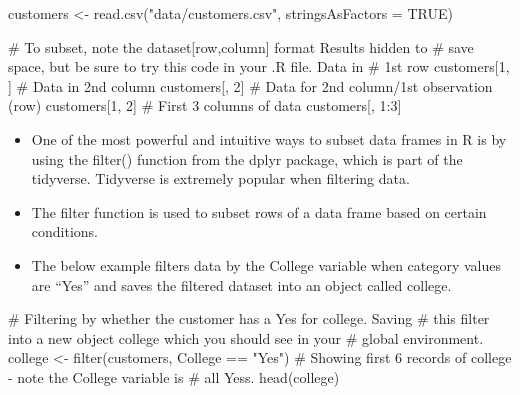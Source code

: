 \documentclass[
  letterpaper,
  DIV=11,
  numbers=noendperiod]{scrreprt}
\newenvironment{Shaded}{\begin{snugshade}}{\end{snugshade}}
\newcommand{\AttributeTok}[1]{\textcolor[rgb]{0.40,0.45,0.13}{#1}}
\newcommand{\CommentTok}[1]{\textcolor[rgb]{0.37,0.37,0.37}{#1}}
\newcommand{\ConstantTok}[1]{\textcolor[rgb]{0.56,0.35,0.01}{#1}}
\newcommand{\DecValTok}[1]{\textcolor[rgb]{0.68,0.00,0.00}{#1}}
\newcommand{\FunctionTok}[1]{\textcolor[rgb]{0.28,0.35,0.67}{#1}}
\newcommand{\NormalTok}[1]{\textcolor[rgb]{0.00,0.23,0.31}{#1}}
\newcommand{\OtherTok}[1]{\textcolor[rgb]{0.00,0.23,0.31}{#1}}
\newcommand{\SpecialCharTok}[1]{\textcolor[rgb]{0.37,0.37,0.37}{#1}}
\newcommand{\StringTok}[1]{\textcolor[rgb]{0.13,0.47,0.30}{#1}}
\providecommand{\tightlist}{%
  \setlength{\itemsep}{0pt}\setlength{\parskip}{0pt}}\usepackage{longtable,booktabs,array}
\begin{document}
\begin{Shaded}
\begin{Highlighting}[]
\NormalTok{customers }\OtherTok{\textless{}{-}} \FunctionTok{read.csv}\NormalTok{(}\StringTok{"data/customers.csv"}\NormalTok{, }\AttributeTok{stringsAsFactors =} \ConstantTok{TRUE}\NormalTok{)}

\CommentTok{\# To subset, note the dataset[row,column] format Results hidden to}
\CommentTok{\# save space, but be sure to try this code in your .R file.  Data in}
\CommentTok{\# 1st row}
\NormalTok{customers[}\DecValTok{1}\NormalTok{, ]}
\CommentTok{\# Data in 2nd column}
\NormalTok{customers[, }\DecValTok{2}\NormalTok{]}
\CommentTok{\# Data for 2nd column/1st observation (row)}
\NormalTok{customers[}\DecValTok{1}\NormalTok{, }\DecValTok{2}\NormalTok{]}
\CommentTok{\# First 3 columns of data}
\NormalTok{customers[, }\DecValTok{1}\SpecialCharTok{:}\DecValTok{3}\NormalTok{]}
\end{Highlighting}
\end{Shaded}

\begin{itemize}
\tightlist
\item
  One of the most powerful and intuitive ways to subset data frames in R
  is by using the filter() function from the dplyr package, which is
  part of the tidyverse. Tidyverse is extremely popular when filtering
  data.
\item
  The filter function is used to subset rows of a data frame based on
  certain conditions.
\item
  The below example filters data by the College variable when category
  values are ``Yes'' and saves the filtered dataset into an object
  called college.
\end{itemize}

\begin{Shaded}
\begin{Highlighting}[]
\CommentTok{\# Filtering by whether the customer has a \textquotesingle{}Yes\textquotesingle{} for college.  Saving}
\CommentTok{\# this filter into a new object college which you should see in your}
\CommentTok{\# global environment.}
\NormalTok{college }\OtherTok{\textless{}{-}} \FunctionTok{filter}\NormalTok{(customers, College }\SpecialCharTok{==} \StringTok{"Yes"}\NormalTok{)}
\CommentTok{\# Showing first 6 records of college {-} note the College variable is}
\CommentTok{\# all Yes\textquotesingle{}s.}
\FunctionTok{head}\NormalTok{(college)}
\end{Highlighting}
\end{Shaded}
\end{document}
